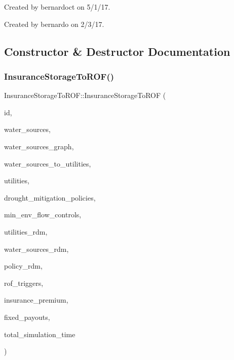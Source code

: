 Created by bernardoct on 5/1/17.

Created by bernardo on 2/3/17. 

\subsection{Constructor \& Destructor Documentation}
\mbox{\label{classInsuranceStorageToROF_a7769ebf2a6c73fa0efc55268712e8157}} 
\subsubsection{\texorpdfstring{Insurance\+Storage\+To\+R\+O\+F()}{InsuranceStorageToROF()}\hspace{0.1cm}{\footnotesize\ttfamily [1/2]}}
{\footnotesize\ttfamily Insurance\+Storage\+To\+R\+O\+F\+::\+Insurance\+Storage\+To\+R\+OF (\begin{DoxyParamCaption}\item[{const int}]{id,  }\item[{vector$<$ \mbox{\hyperlink{classWaterSource}{Water\+Source}} $\ast$$>$ \&}]{water\+\_\+sources,  }\item[{const \mbox{\hyperlink{classGraph}{Graph}} \&}]{water\+\_\+sources\+\_\+graph,  }\item[{const vector$<$ vector$<$ int $>$$>$ \&}]{water\+\_\+sources\+\_\+to\+\_\+utilities,  }\item[{vector$<$ \mbox{\hyperlink{classUtility}{Utility}} $\ast$$>$ \&}]{utilities,  }\item[{vector$<$ \mbox{\hyperlink{classDroughtMitigationPolicy}{Drought\+Mitigation\+Policy}} $\ast$$>$ \&}]{drought\+\_\+mitigation\+\_\+policies,  }\item[{vector$<$ \mbox{\hyperlink{classMinEnvFlowControl}{Min\+Env\+Flow\+Control}} $\ast$$>$}]{min\+\_\+env\+\_\+flow\+\_\+controls,  }\item[{vector$<$ vector$<$ double $>$$>$ \&}]{utilities\+\_\+rdm,  }\item[{vector$<$ vector$<$ double $>$$>$ \&}]{water\+\_\+sources\+\_\+rdm,  }\item[{vector$<$ vector$<$ double $>$$>$ \&}]{policy\+\_\+rdm,  }\item[{vector$<$ double $>$ \&}]{rof\+\_\+triggers,  }\item[{const double}]{insurance\+\_\+premium,  }\item[{const vector$<$ double $>$ \&}]{fixed\+\_\+payouts,  }\item[{unsigned long}]{total\+\_\+simulation\+\_\+time }\end{DoxyParamCaption})}



